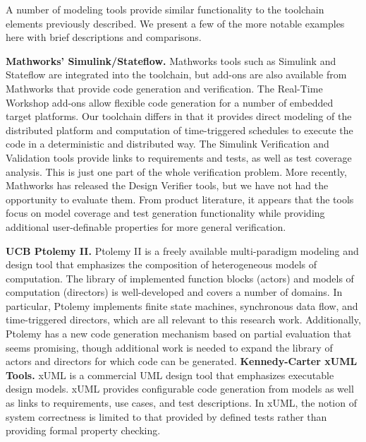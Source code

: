 A number of modeling tools provide similar functionality to the toolchain elements previously described.  We present a few of the more notable examples here with brief descriptions and comparisons.

\textbf{Mathworks' Simulink/Stateflow.} \cite{mathworks:tools} Mathworks tools such as Simulink and Stateflow are integrated into the toolchain, but add-ons are also available from Mathworks that provide code generation and verification.  The Real-Time Workshop add-ons allow flexible code generation for a number of embedded target platforms.   Our toolchain differs in that it provides direct modeling of the distributed platform and computation of time-triggered schedules to execute the code in a deterministic and distributed way.  The Simulink Verification and Validation tools provide links to requirements and tests, as well as test coverage analysis.  This is just one part of the whole verification problem.  More recently, Mathworks has released the Design Verifier tools, but we have not had the opportunity to evaluate them.  From product literature, it appears that the tools focus on model coverage and test generation functionality while providing additional user-definable properties for more general verification.

\textbf{UCB Ptolemy II.} \cite{ucb:ptolemy2} Ptolemy II is a freely available multi-paradigm modeling and design tool that emphasizes the composition of heterogeneous models of computation.   The library of implemented function blocks (actors) and models of computation (directors) is well-developed and covers a number of domains. In particular, Ptolemy implements finite state machines, synchronous data flow, and time-triggered directors, which are all relevant to this research work.  Additionally, Ptolemy has a new code generation mechanism based on partial evaluation \cite{ZhouLeungLee2007} that seems promising, though additional work is needed to expand the library of actors and directors for which code can be generated.
\vskip 12pt
\textbf{Kennedy-Carter xUML Tools.} \cite{kc:xuml} xUML is a commercial UML design tool that emphasizes executable design models.  xUML provides configurable code generation from models as well as links to requirements, use cases, and test descriptions.  In xUML, the notion of system correctness is limited to that provided by defined tests rather than providing formal property checking.

